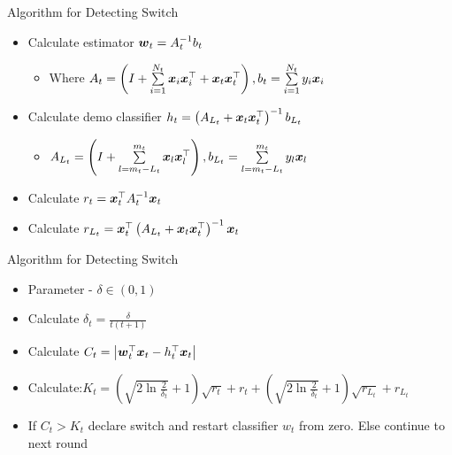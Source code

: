 \documentclass{beamer}
\begin{document}
\begin{frame}{Algorithm for Detecting Switch}

\begin{itemize}
\item Calculate estimator ${\boldsymbol{w}}_{t}=A_{t}^{-1}b_t$ \newline
\begin{itemize}
\item Where $A_t=\left(I+\sum\limits_{i=1}^{N_t}{\boldsymbol{x}}_{i} {{\boldsymbol{x}}}^{\top}_{i}+ {\boldsymbol{x}}_{t} {{\boldsymbol{x}}}^{\top}_{t}\right), b_t=\sum\limits_{i=1}^{N_t}y_i{\boldsymbol{x}}_{i}$\newline\newline
\end{itemize}
\item Calculate demo classifier $h_t=\left(A_{L_t}+{\boldsymbol{x}}_{t}{{\boldsymbol{x}}}^{\top}_{t}\right)^{-1}b_{L_t}$ \newline
\begin{itemize}
\item $A_{L_t}=\left(I+\sum\limits_{l=m_t-L_t}^{m_t}{{\boldsymbol{x}}_{l}{{\boldsymbol{x}}}^{\top}_{l}}\right), b_{L_t}=\sum\limits_{l=m_t-L_t}^{m_t}y_l{\boldsymbol{x}}_{l}$ \newline\newline
\end{itemize}
\item Calculate $r_t={{\boldsymbol{x}}}^{\top}_{t}A_{t}^{-1}{\boldsymbol{x}}_{t}$\newline
\item Calculate $r_{L_t}={{\boldsymbol{x}}}^{\top}_{t}\left(A_{L_t}+{\boldsymbol{x}}_{t}{{\boldsymbol{x}}}^{\top}_{t}\right)^{-1}{\boldsymbol{x}}_{t}$
\end{itemize}
\end{frame}

\begin{frame}{Algorithm for Detecting Switch}
\begin{itemize}
\item Parameter - $\delta\in\left(0,1\right)$\newline
\item Calculate $\delta_t=\frac{\delta}{t(t+1)}$\newline
\item Calculate $C_t=\left\vert{{\boldsymbol{w}}}^{\top}_{t}{\boldsymbol{x}}_{t}-h_{t}^{\top}{\boldsymbol{x}}_{t}\right\vert$\newline
\item Calculate:\newline\newline $K_t=\left(\sqrt{2\ln{\frac{2}{\delta_t}}}+1\right)\sqrt{r_t}+r_t+\left(\sqrt{2\ln{\frac{2}{\delta_t}}}+1\right)\sqrt{r_{L_t}}+r_{L_t}$\newline
\item If $C_t>K_t$ declare switch and restart classifier $w_t$ from zero. Else continue to next round
\end{itemize}
\end{frame}
\end{document}
